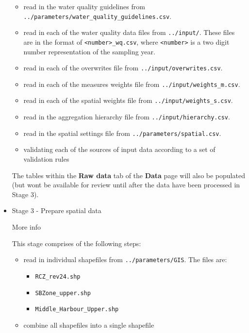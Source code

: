 \documentclass[
  8pt,
  a4paper]{article}
\providecommand{\tightlist}{%
  \setlength{\itemsep}{0pt}\setlength{\parskip}{0pt}}
\begin{document}
\begin{itemize}
  \begin{itemize}
  \tightlist
  \item
    read in the water quality guidelines from
    \texttt{../parameters/water\_quality\_guidelines.csv}.
  \item
    read in each of the water quality data files from
    \texttt{../input/}. These files are in the format of
    \texttt{\textless{}number\textgreater{}\_wq.csv}, where
    \texttt{\textless{}number\textgreater{}} is a two digit number
    representation of the sampling year.
  \item
    read in each of the overwrites file from
    \texttt{../input/overwrites.csv}.
  \item
    read in each of the measures weights file from
    \texttt{../input/weights\_m.csv}.
  \item
    read in each of the spatial weights file from
    \texttt{../input/weights\_s.csv}.
  \item
    read in the aggregation hierarchy file from
    \texttt{../input/hierarchy.csv}.
  \item
    read in the spatial settings file from
    \texttt{../parameters/spatial.csv}.
  \item
    validating each of the sources of input data according to a set of
    validation rules
  \end{itemize}

  The tables within the \textbf{Raw data} tab of the \textbf{Data} page
  will also be populated (but wont be available for review until after
  the data have been processed in Stage 3).
\item
  Stage 3 - Prepare spatial data

  More info

  This stage comprises of the following steps:

  \begin{itemize}
  \tightlist
  \item
    read in individual shapefiles from \texttt{../parameters/GIS}. The
    files are:

    \begin{itemize}
    \tightlist
    \item
      \texttt{RCZ\_rev24.shp}
    \item
      \texttt{SBZone\_upper.shp}
    \item
      \texttt{Middle\_Harbour\_Upper.shp}
    \end{itemize}
  \item
    combine all shapefiles into a single shapefile
  \end{itemize}


\end{itemize}
\end{document}

